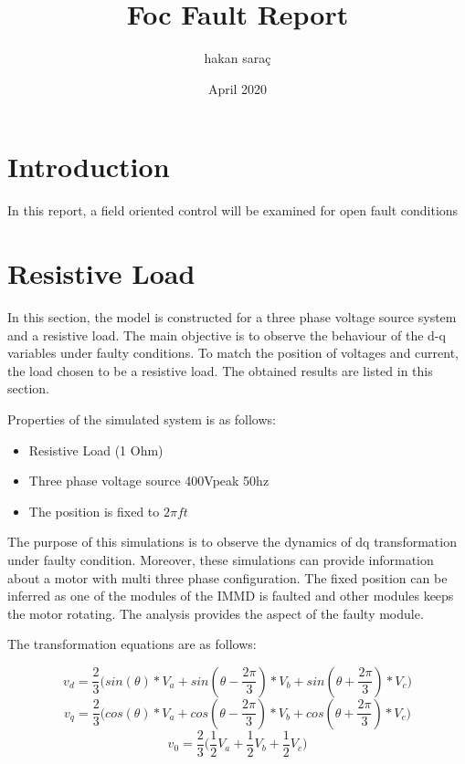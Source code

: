 \documentclass{article}
\title{Foc Fault Report}
\author{hakan saraç}
\date{April 2020}
\begin{document}
\maketitle

\section{Introduction}
In this report, a field oriented control will be examined for open fault conditions

\section{Resistive Load} 
In this section, the model is constructed for a three phase voltage source system and a resistive load. The main objective is to observe the behaviour of the d-q variables under faulty conditions. To match the position of voltages and current, the load chosen to be a resistive load. The obtained results are listed in this section.



Properties of the simulated system is as follows:
\begin{itemize}
    \item Resistive Load (1 Ohm)
    \item Three phase voltage source 400Vpeak 50hz 
    \item The position is fixed to $2 \pi f t$
\end{itemize}


The purpose of this simulations is to observe the dynamics of dq transformation under faulty condition. Moreover, these simulations can provide information about a motor with multi three phase configuration. The fixed position can be inferred as one of the modules of the IMMD is faulted and other modules keeps the motor rotating. The analysis provides the aspect of the faulty module. \newline

The transformation equations are as follows:

\begin{equation}  \label{eq:eqnVd}
 v_d = \frac{2}{3}\Bigg(sin(\theta)*V_a + sin(\theta-\frac{2\pi}{3})*V_b + sin(\theta+\frac{2\pi}{3})*V_c\Bigg)
\end{equation}
\begin{equation} \label{eq:eqnVq}
v_q = \frac{2}{3}\Bigg(cos(\theta)*V_a + cos(\theta-\frac{2\pi}{3})*V_b + cos(\theta+\frac{2\pi}{3})*V_c\Bigg)
\end{equation}
\begin{equation} \label{eq:eqnV0}
 v_0 = \frac{2}{3}\Bigg(\frac{1}{2}V_a+\frac{1}{2}V_b+\frac{1}{2}V_c\Bigg)
\end{equation}
\end{document}
